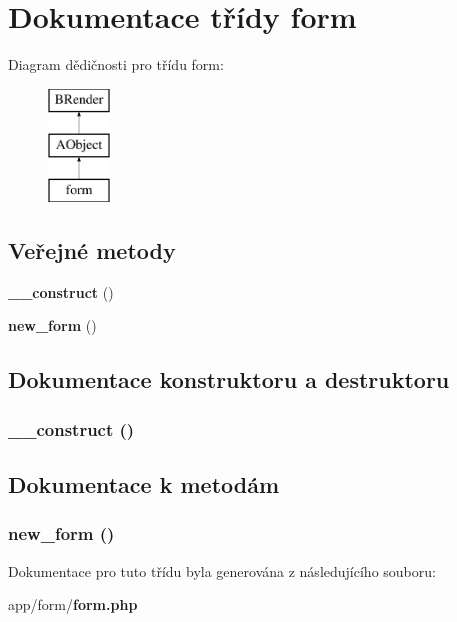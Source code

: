 \section{Dokumentace třídy form}
\label{df/d7c/classform}
Diagram dědičnosti pro třídu form:\begin{figure}[H]
\begin{center}
\leavevmode
\includegraphics[height=3cm]{df/d7c/classform}
\end{center}
\end{figure}
\subsection*{Veřejné metody}
\begin{DoxyCompactItemize}
\item 
{\bf \_\-\_\-construct} ()
\item 
{\bf new\_\-form} ()
\end{DoxyCompactItemize}


\subsection{Dokumentace konstruktoru a destruktoru}
\subsubsection[{\_\-\_\-construct}]{\setlength{\rightskip}{0pt plus 5cm}\_\-\_\-construct ()}\label{df/d7c/classform_a095c5d389db211932136b53f25f39685}


\subsection{Dokumentace k metodám}
\subsubsection[{new\_\-form}]{\setlength{\rightskip}{0pt plus 5cm}new\_\-form ()}\label{df/d7c/classform_a77cc2d06b0fe74c7f6e7c6ccf98c8eca}


Dokumentace pro tuto třídu byla generována z následujícího souboru:\begin{DoxyCompactItemize}
\item 
app/form/{\bf form.php}\end{DoxyCompactItemize}
